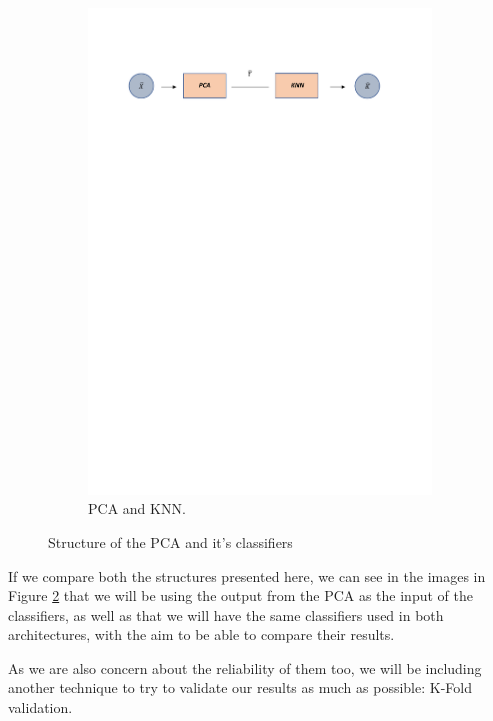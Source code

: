 \documentclass[12pt]{report}
\begin{document}
\begin{figure}[H]
\begin{subfigure}{1\linewidth} 
  \centering
  \includegraphics[width=\linewidth]{Figuras_tfg/Diagram_pca_KNN}
  \caption{PCA and KNN.}
  \label{fig:FigB_PCA_KNN} 
\end{subfigure}
  \caption{Structure of the PCA and it's classifiers}
 \label{fig:PCA_architecture}
\end{figure}

If we compare both the structures presented here, we can see in the images in Figure \ref{fig:PCA_architecture} that we will be using the output from the PCA as the input of the classifiers, as well as that we will have the same classifiers used in both architectures, with the aim to be able to compare their results.\par

As we are also concern about the reliability of them too, we will be including another technique to try to validate our results as much as possible: K-Fold validation. \par
\end{document}
